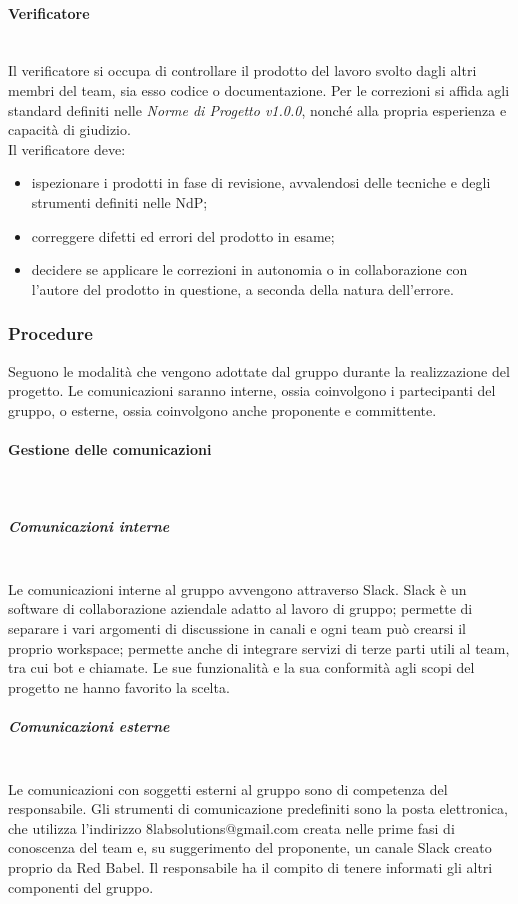 			\paragraph{Verificatore} \mbox{}\\
			Il verificatore si occupa di controllare il prodotto del lavoro svolto dagli altri membri del team, sia esso codice o documentazione. Per le correzioni si affida agli standard definiti nelle \textit{Norme di Progetto v1.0.0}, nonché alla propria esperienza e capacità di giudizio.\\
			Il verificatore deve:
			\begin{itemize}
				\item ispezionare i prodotti in fase di revisione, avvalendosi delle tecniche e degli strumenti definiti nelle NdP;
				\item correggere difetti ed errori del prodotto in esame;
				\item decidere se applicare le correzioni in autonomia o in collaborazione con l'autore del prodotto in questione, a seconda della natura dell'errore.
			\end{itemize}
		\subsubsection{Procedure}
		Seguono le modalità che vengono adottate dal gruppo durante la realizzazione del progetto. Le comunicazioni saranno interne, ossia coinvolgono i partecipanti del gruppo, o esterne, ossia coinvolgono anche proponente e committente.
			\paragraph{Gestione delle comunicazioni} \mbox{}\\
			\subparagraph{Comunicazioni interne} \mbox{}\\
			Le comunicazioni interne al gruppo avvengono attraverso Slack. Slack è un software di collaborazione aziendale adatto al lavoro di gruppo; permette di separare i vari argomenti di discussione in canali e ogni team può crearsi il proprio workspace; permette anche di integrare servizi di terze parti utili al team, tra cui bot e chiamate. Le sue funzionalità e la sua conformità agli scopi del progetto ne hanno favorito la scelta.
			\subparagraph{Comunicazioni esterne} \mbox{}\\
			Le comunicazioni con soggetti esterni al gruppo sono di competenza del responsabile. Gli strumenti di comunicazione predefiniti sono la posta elettronica, che utilizza l'indirizzo 8labsolutions@gmail.com creata nelle prime fasi di conoscenza del team e, su suggerimento del proponente, un canale Slack creato proprio da Red Babel. Il responsabile ha il compito di tenere informati gli altri componenti del gruppo.
